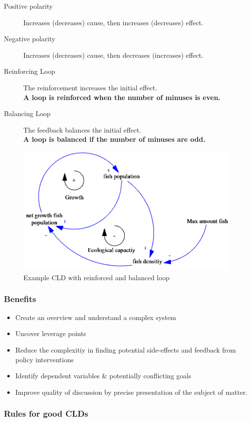 \begin{description}
	\item[Positive polarity] Increases (decreases) cause, then increases
	(decreases) effect.
	\item[Negative polarity] Increases (decreases) cause, then decreases
	(increases) effect.
	\item[Reinforcing Loop] The reinforcement increases the initial effect.\\
	\textbf{A loop is reinforced when the number of minuses is even.}
	\item[Balancing Loop] The feedback balances the initial effect.\\
	\textbf{A loop is balanced if the number of minuses are odd.}
\end{description}

\begin{figure}[H]
\centering
\includegraphics[width=.6\textwidth]{figures/cldFishpopulation.png}
\caption{Example CLD with reinforced and balanced loop}
\end{figure}

\subsubsection{Benefits}

\begin{itemize}
	\tightlist
	\item Create an overview and understand a complex system
	\item Uncover leverage points
	\item Reduce the complexitiy in finding potential side-effects and feedback
	from policy interventions
	\item Identify dependent variables \& potentially conflicting goals
	\item Improve quality of discussion by precise presentation of the subject
	of matter.
\end{itemize}

\subsubsection{Rules for good CLDs}

